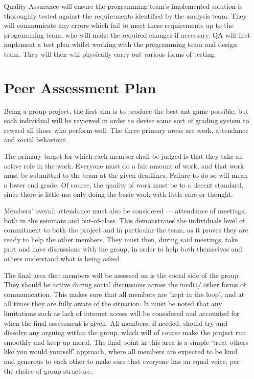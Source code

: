 \documentclass[11pt]{article}
\begin{document}
Quality Assurance will ensure the programming team's implemented solution is thoroughly tested against the requirements identified by the analysis team. They will communicate any errors which fail to meet these requirements up to the programming team, who will make the required changes if necessary. QA will first implement a test plan whilst working with the programming team and design team. They will then will physically carry out various forms of testing.

\newpage
\section{Peer Assessment Plan}

Being a group project, the first aim is to produce the best ant game possible, but each individual will be reviewed in order to devise some sort of grading system to reward all those who perform well. The three primary areas are work, attendance and social behaviour. 

The primary target for which each member shall be judged is that they take an active role in the work. Everyone must do a fair amount of work, and that work must be submitted to the team at the given deadlines. Failure to do so will mean a lower end grade. Of course, the quality of work must be to a decent standard, since there is little use only doing the basic work with little care or thought. 

Members' overall attendance must also be considered --- attendance of meetings, both in the seminars and out-of-class. This demonstrates the individuals level of commitment to both the project and in particular the team, as it proves they are ready to help the other members. They must then, during said meetings, take part and have discussions with the group, in order to help both themselves and others understand what is being asked. 

The final area that members will be assessed on is the social side of the group. They should be active during social discussions across the media/ other forms of communication. This makes sure that all members are `kept in the loop', and at all times they are fully aware of the situation. It must be noted that any limitations such as lack of internet access will be considered and accounted for when the final assessment is given. All members, if needed, should try and dissolve any arguing within the group, which will of course make the project run smoothly and keep up moral. The final point in this area is a simple `treat others like you would yourself' approach, where all members are expected to be kind and generous to each other to make sure that everyone has an equal voice, per the choice of group structure. 
\end{document}
